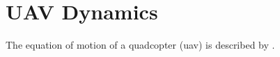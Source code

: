 \section{UAV Dynamics}

The equation of motion of a quadcopter (\gls*{uav}) is described by \citet{fossen1994}.


